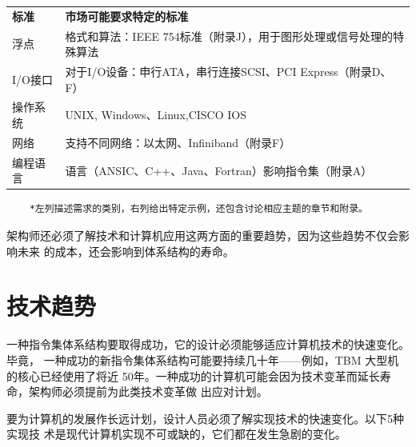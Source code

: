 \begin{table}[]
\begin{tabular}{C{0.15\textwidth}C{0.7\textwidth}}
    \textbf{标准}         & \textbf{市场可能要求特定的标准} \\
    浮点         & 格式和算法：IEEE 754标准（附录J），用于图形处理或信号处理的特殊算法 \\
    I/O接口         & 对于I/O设备：申行ATA，串行连接SCSI、PCI Express（附录D、F） \\
    操作系统         & UNIX, Windows、Linux,CISCO IOS \\
    网络         & 支持不同网络：以太网、Infiniband（附录F） \\
    编程语言         & 语言（ANSIC、C++、Java、Fortran）影响指令集（附录A） \\ \hline
    \end{tabular}
\end{table}
\begin{verbatim}
    *左列描述需求的类别，右列给出特定示例，还包含讨论相应主题的章节和附录。
\end{verbatim}
架构师还必须了解技术和计算机应用这两方面的重要趋势，因为这些趋势不仅会影响未来
的成本，还会影响到体系结构的寿命。
\section{技术趋势}
一种指令集体系结构要取得成功，它的设计必须能够适应计算机技术的快速变化。毕竟，
一种成功的新指令集体系结构可能要持续几十年——例如，TBM 大型机的核心已经使用了将近
50年。一种成功的计算机可能会因为技术变革而延长寿命，架构师必须提前为此类技术变革做
出应对计划。

要为计算机的发展作长远计划，设计人员必须了解实现技术的快速变化。以下5种实现技
术是现代计算机实现不可或缺的，它们都在发生急剧的变化。

